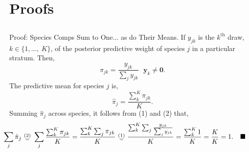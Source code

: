 \documentclass[ xcolor = pdftex, dvipsnames, table ]{beamer}
\begin{document}
%
%

%
\section{Proofs}
\subsection{}
\begin{frame}{Proof: Species Comps Sum to One... as do Their Means.}
%
If $y_{jk}$ is the $k^{\text{th}}$ draw, $k\in\{1,...,~K\}$, of the posterior predictive weight of species $j$ in a particular stratum. Then,
%
\begin{equation}
\pi_{jk} = \frac{y_{jk}}{\sum_j y_{jk}} ~~~ \bm{y}_{k}\neq \bm{0}.
\end{equation}
The predictive mean for species $j$ is,
\begin{equation}
        \hat\pi_{j} = \frac{\sum_k^K \pi_{jk}}{K}. 
\end{equation}
Summing $\hat\pi_{j}$ across species, it follows from (1) and (2) that,
\begin{equation*}
        \hspace*{-0.8cm}
        \sum_j \hat\pi_{j} ~\substack{(2)\\=}~ \sum_j\frac{\sum_k^K \pi_{jk}}{K} = \frac{\sum_k^K \sum_j \pi_{jk}}{K}~\substack{(1)\\=}~\frac{\sum_k^K \sum_j \frac{y_{jk}}{\sum_j y_{jk}}}{K} = \frac{\sum_k^K 1}{K} = \frac{K}{K}=1. ~~~\blacksquare
\end{equation*}
%
\end{frame}

%
%

%
\end{document}
